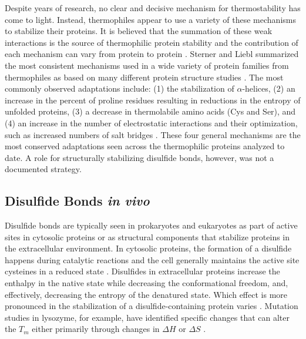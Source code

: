 {%


Despite years of research, no clear and decisive mechanism for
thermostability has come to light.  Instead, thermophiles appear to use a
variety of these mechanisms to stabilize their proteins. It is believed that the
summation of these weak interactions is the source of thermophilic protein
stability and the contribution of each mechanism can vary from protein to
protein
\cite{chakravarty2002efr,PMID_11577980,vieille2001hes,jaenicke1998spe,petsko2001sbt,rees1995hth}.
Sterner and Liebl summarized the most consistent mechanisms used in a wide
variety of protein families from thermophiles as based on many different protein
structure studies
\cite{PMID_10097079,PMID_11577980,beeby_31,beeby_29,PMID_10940293,thompson1999tel}.
The most commonly observed adaptations include: (1) the stabilization of
$\alpha$-helices, (2) an increase in the percent of proline residues resulting
in reductions in the entropy of unfolded proteins, (3) a decrease in
thermolabile amino acids (Cys and Ser), and (4) an increase in the number of
electrostatic interactions and their optimization, such as increased numbers of
salt bridges \cite{PMID_11256505}. These four general mechanisms are the most
conserved adaptations seen across the thermophilic proteins analyzed to date.
A role for structurally stabilizing disulfide bonds, however, was not a
documented strategy.

\subsection{Disulfide Bonds \emph{in vivo}}


Disulfide bonds are typically seen in prokaryotes and eukaryotes as part of 
active sites in cytosolic proteins or as structural components that stabilize
proteins in the extracellular environment.  In cytosolic proteins, the
formation of a disulfide happens during catalytic reactions and the cell
generally maintains the active site cysteines in a reduced state
\cite{32,33,34,35}.   Disulfides in extracellular proteins increase the
enthalpy in the native state while decreasing the conformational freedom, and,
effectively, decreasing the entropy of the denatured state.  Which effect is
more pronounced in the stabilization of a disulfide-containing protein varies
\cite{119,121,120}. Mutation studies in lysozyme, for example, have identified
specific changes that can alter the ${T }_{m }$ either primarily through
changes in $\Delta H$ or $\Delta S$ \cite{125,124}. 

}
